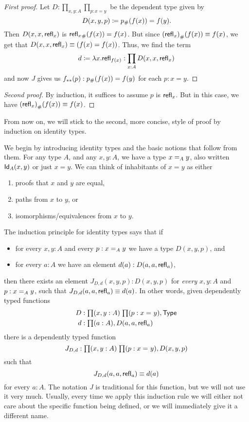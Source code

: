 \begin{proof}[First proof]
  Let $D:\prod_{x,y:A}\prod_{p:x=y}$ be the dependent type given by
  \begin{equation*}
    D(x,y,p)\coloneqq \trans p {f(x)}= f(y).
  \end{equation*}
  Then $D(x,x,\refl{x})$ is $\trans{\refl{x}}{f(x)}= f(x)$.
  But since $\trans{(\refl{x})}{f(x)}\jdeq f(x)$, we get that $D(x,x,\refl{x})\jdeq (f(x)= f(x))$.
  Thus, we find the term
  \begin{equation*}
    d\coloneqq\lambda x.\refl{f(x)}:\prod_{x:A} D(x,x,\refl{x})
  \end{equation*}
  and now $J$ gives us $\mapdep fp:\trans p{f(x)}= f(y)$ for each $p:x= y$.
\end{proof}

\begin{proof}[Second proof]
  By induction, it suffices to assume $p$ is $\refl x$.
  But in this case, we have $\trans{(\refl{x})}{f(x)}\jdeq f(x)$.
\end{proof}

From now on, we will stick to the second, more concise, style of proof by induction on identity types.


We begin by introducing identity types and the basic notions that follow from them.
For any type $A$, and any $x,y:A$, we have a type $\id[A]{x}{y}$, also written $\idtype[A]{x}{y}$ or just $x=y$.
We can think of inhabitants of $x=y$ as either
\begin{enumerate}
\item proofs that $x$ and $y$ are equal,
\item paths from $x$ to $y$, or
\item isomorphisms/equivalences from $x$ to $y$.
\end{enumerate}
The induction principle for identity types says that if
\begin{itemize}
\item for every $x,y:A$ and every $p:\id[A]xy$ we have a type $D(x,y,p)$, and
\item for every $a:A$ we have an element $d(a):D(a,a,\refl a)$, 
\end{itemize}
then there exists an element $J_{D,d}(x,y,p):D(x,y,p)$ for \emph{every} $x,y:A$ and $p:\id[A]xy$, such that $J_{D,d}(a,a,\refl a) \jdeq d(a)$.
In other words, given dependently typed functions
\begin{align*}
D & :\prd{x,y:A}{p:\id{x}{y}} \type\\
d & :\prd{a:A} D(a,a,\refl{a})
\end{align*}
there is a dependently typed function
\[J_{D,d}:\prd{x,y:A}{p:\id{x}{y}} D(x,y,p)\]
such that 
\begin{equation}\label{eq:Jconv}
J_{D,d}(a,a,\refl{a})\jdeq d(a)
\end{equation}
for every $a:A$.
The notation $J$ is traditional for this function, but we will not use it very much.
Usually, every time we apply this induction rule we will either not care about the specific function being defined, or we will immediately give it a different name.

